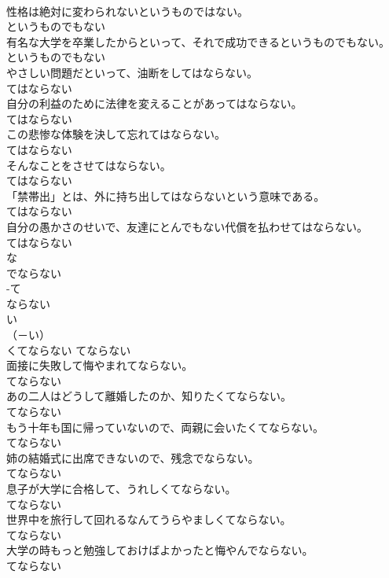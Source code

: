 \documentclass[8pt]{extreport}
\begin{document}
\begin{CJK}{UTF8}{min}
\\	性格は絶対に変わられないというものではない。	
\\	というものでもない
\\	有名な大学を卒業したからといって、それで成功できるというものでもない。	
\\	というものでもない
\\	やさしい問題だといって、油断をしてはならない。	
\\	てはならない
\\	自分の利益のために法律を変えることがあってはならない。	
\\	てはならない
\\	この悲惨な体験を決して忘れてはならない。	
\\	てはならない
\\	そんなことをさせてはならない。	
\\	てはならない
\\	「禁帯出」とは、外に持ち出してはならないという意味である。	
\\	てはならない
\\	自分の愚かさのせいで、友達にとんでもない代償を払わせてはならない。	
\\	てはならない
\\	な
\\	でならない	
\\	-て
\\	ならない	
\\	い
\\	（－い） 
\\	くてならない	てならない
\\	面接に失敗して悔やまれてならない。	
\\	てならない
\\	あの二人はどうして離婚したのか、知りたくてならない。	
\\	てならない
\\	もう十年も国に帰っていないので、両親に会いたくてならない。	
\\	てならない
\\	姉の結婚式に出席できないので、残念でならない。	
\\	てならない
\\	息子が大学に合格して、うれしくてならない。	
\\	てならない
\\	世界中を旅行して回れるなんてうらやましくてならない。	
\\	てならない
\\	大学の時もっと勉強しておけばよかったと悔やんでならない。	
\\	てならない

\end{CJK}
\end{document}
